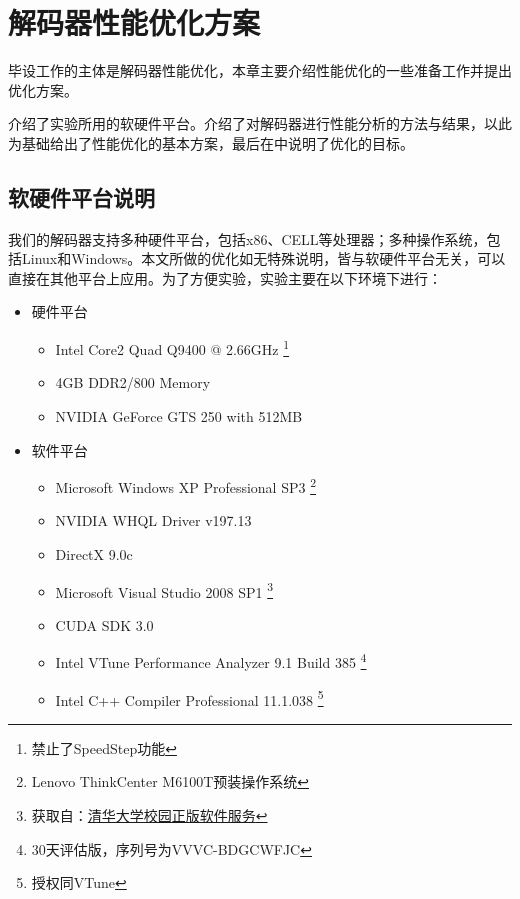 

\cleardoublepage

\chapter{解码器性能优化方案}
\label{cha:optapproach}

毕设工作的主体是解码器性能优化，本章主要介绍性能优化的一些准备工作并提出优化方案。

介绍了实验所用的软硬件平台。介绍了对解码器进行性能分析的方法与结果，以此为基础给出了性能优化的基本方案，最后在中说明了优化的目标。

\section{软硬件平台说明}
\label{sec:platformdesc}

我们的解码器支持多种硬件平台，包括x86、CELL等处理器；多种操作系统，包括Linux和Windows。本文所做的优化如无特殊说明，皆与软硬件平台无关，可以直接在其他平台上应用。为了方便实验，实验主要在以下环境下进行：

\begin{itemize}
\item {硬件平台}

\begin{itemize}
\item Intel Core2 Quad Q9400 @ 2.66GHz
	\footnote{禁止了SpeedStep功能}
\item 4GB DDR2/800 Memory
\item NVIDIA GeForce GTS 250 with 512MB
\end{itemize}

\item {软件平台}

\begin{itemize}
\item Microsoft Windows XP Professional SP3
	\footnote{Lenovo ThinkCenter M6100T预装操作系统}
\item NVIDIA WHQL Driver v197.13
\item DirectX 9.0c
\item Microsoft Visual Studio 2008 SP1
	\footnote{获取自：\href{http://helpdesk.tsinghua.edu.cn/yhfw/yhfw_zbrj_tz.jsp}{清华大学校园正版软件服务}}
\item CUDA SDK 3.0
\item Intel VTune Performance Analyzer 9.1 Build 385
	\footnote{30天评估版，序列号为VVVC-BDGCWFJC}
\item Intel C++ Compiler Professional 11.1.038
	\footnote{授权同VTune}
\end{itemize}

\end{itemize}


